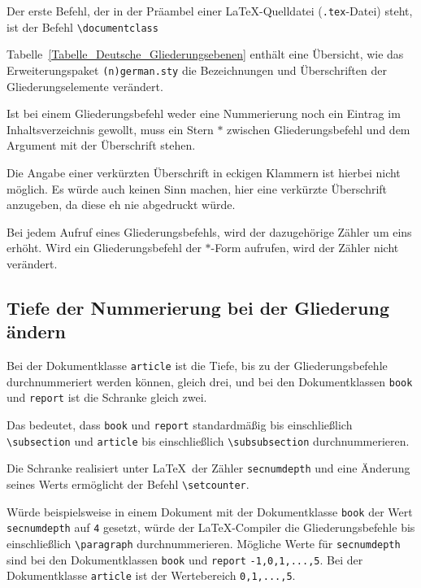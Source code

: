 Der erste Befehl, der in der Präambel einer \LaTeX-Quelldatei (\verb!.tex!-Datei) steht, ist der Befehl \verb!\documentclass!
\begin{document}
Tabelle~\ref{Tabelle_Deutsche_Gliederungsebenen} enthält eine Übersicht, wie das Erweiterungspaket \verb!(n)german.sty! 
die Bezeichnungen und Überschriften der 
Gliederungselemente verändert.

Ist bei einem Gliederungsbefehl weder
eine Nummerierung noch ein
Eintrag im Inhaltsverzeichnis gewollt, 
muss ein Stern $\ast$ zwischen 
Gliederungsbefehl und dem Argument mit der Überschrift stehen.


Die Angabe einer verkürzten Überschrift in eckigen Klammern ist hierbei nicht möglich. Es würde auch keinen Sinn machen, hier eine verkürzte Überschrift anzugeben, da diese eh nie abgedruckt würde.

Bei jedem Aufruf
eines Gliederungsbefehls, 
wird der dazugehörige Zähler um eins 
erhöht. Wird ein Gliederungsbefehl 
der $\ast$-Form aufrufen, wird der
Zähler nicht verändert.

\subsection{Tiefe der Nummerierung bei der Gliederung ändern}

Bei der Dokumentklasse \verb!article! ist die Tiefe, 
bis zu der Gliederungsbefehle
durchnummeriert werden können, gleich drei, und bei den Dokumentklassen 
\verb!book! und \verb!report! ist die Schranke gleich zwei. 

Das bedeutet, dass \verb!book! und \verb!report! 
standardmäßig bis
einschließlich \texttt{\textbackslash subsection} und \verb!article! 
bis einschließlich \verb!\subsubsection! durchnummerieren.

Die Schranke realisiert unter \LaTeX\ der Zähler \verb!secnumdepth! 
und eine Änderung seines Werts ermöglicht der Befehl \verb|\setcounter|.




Würde beispielsweise in einem Dokument mit der 
Dokumentklasse \verb!book! der Wert \verb!secnumdepth! auf \verb!4! gesetzt, 
würde der \LaTeX-Compiler die Gliederungsbefehle bis einschließlich \verb!\paragraph!
durchnummerieren. Mögliche Werte für \verb!secnumdepth! sind bei den 
Dokumentklassen \verb!book! und 
\verb!report! \verb!-1,0,1,...,5!.
Bei der Dokumentklasse \verb!article! 
ist der Wertebereich \verb!0,1,...,5!.
\end{document}
